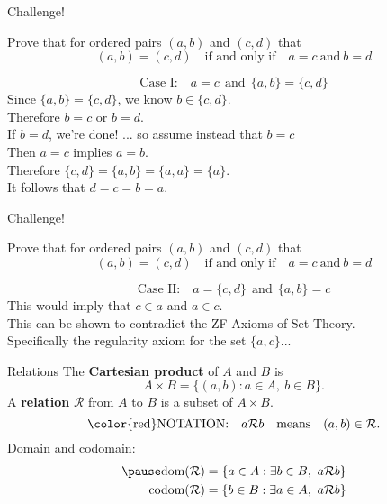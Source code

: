 \documentclass{beamer}
\begin{document}
\begin{frame}{Challenge!}
\begin{prob}
Prove that for ordered pairs $(a,b)$ and $(c,d)$ that
$$(a,b)=(c,d)\quad\text{if and only if}\quad a=c\ \text{and}\ b=d$$
\end{prob}
\begin{soln}
$$\text{Case I:}\quad a=c\ \ \text{and}\ \  \{a,b\} = \{c,d\}$$
\pause
Since $\{a,b\} = \{c,d\}$, we know $b\in \{c,d\}$.\\
\pause
Therefore $b=c$ or $b=d$.\\
If $b=d$, we're done! \pause ... so assume instead that $b=c$\\
\pause
Then $a=c$ implies $a=b$.\\
\pause
Therefore $\{c,d\} = \{a,b\} = \{a,a\} = \{a\}$.\\
\pause
It follows that $d=c=b=a$.
\end{soln}
\end{frame}

\begin{frame}{Challenge!}
\begin{prob}
Prove that for ordered pairs $(a,b)$ and $(c,d)$ that
$$(a,b)=(c,d)\quad\text{if and only if}\quad a=c\ \text{and}\ b=d$$
\end{prob}
\begin{soln}
$$\text{Case II:}\quad a=\{c,d\}\ \ \text{and}\ \ \{a,b\} = c$$
\pause
This would imply that $c\in a$ and $a\in c$.\\
\pause
This can be shown to contradict the ZF Axioms of Set Theory.\\
\pause
Specifically the regularity axiom for the set $\{a,c\}$...
\end{soln}
\end{frame}

\begin{frame}{Relations}
The \textbf{Cartesian product} of $A$ and $B$ is
$$A\times B = \{(a,b): a\in A,\ b\in B\}.$$
\pause
A \textbf{relation} $\mathcal R$ from $A$ to $B$ is a subset of $A\times B$.\\
\pause
$$\text{\color{red}NOTATION:}\quad a\mathcal R b\quad\text{means}\quad (a,b)\in \mathcal R.$$
\pause
Domain and codomain:
\pause
\begin{align*}
\pause
\text{dom}(\mathcal{R}) &= \{a\in A: \exists b\in B,\ a\mathcal R b\}\\
\text{codom}(\mathcal{R}) &= \{b\in B: \exists a\in A,\ a\mathcal R b\}
\end{align*}
\end{frame}
\end{document}
